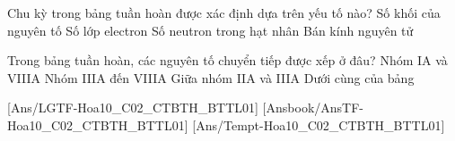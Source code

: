 \begin{ex}%
	Chu kỳ trong bảng tuần hoàn được xác định dựa trên yếu tố nào?
	\choice
	{Số khối của nguyên tố}
	{\True Số lớp electron}
	{Số neutron trong hạt nhân}
	{Bán kính nguyên tử}
\end{ex}
\begin{ex}%
	Trong bảng tuần hoàn, các nguyên tố chuyển tiếp được xếp ở đâu?
	\choice
	{Nhóm IA và VIIIA}
	{Nhóm IIIA đến VIIIA}
	{\True Giữa nhóm IIA và IIIA}
	{Dưới cùng của bảng}
\end{ex}

[Ans/LGTF-Hoa10_C02_CTBTH_BTTL01]
[Ansbook/AnsTF-Hoa10_C02_CTBTH_BTTL01]
[Ans/Tempt-Hoa10_C02_CTBTH_BTTL01]

